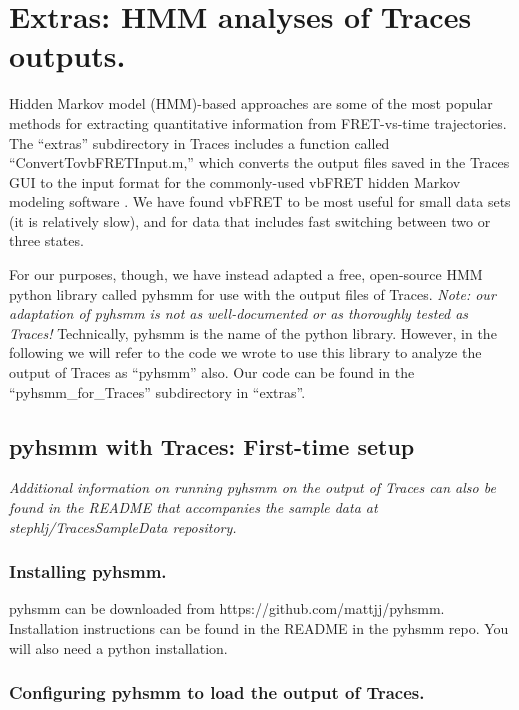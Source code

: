 \documentclass[11pt]{article}
\begin{document}
\newpage

\section{Extras: HMM analyses of Traces outputs.}\label{sec:extras}

Hidden Markov model (HMM)-based approaches are some of the most popular methods for extracting quantitative information from FRET-vs-time trajectories. The ``extras'' subdirectory in Traces includes a function called ``ConvertTovbFRETInput.m,'' which converts the output files saved in the Traces GUI to the input format for the commonly-used vbFRET hidden Markov modeling software \cite{Bronson2009}. We have found vbFRET to be most useful for small data sets (it is relatively slow), and for data that includes fast switching between two or three states.

For our purposes, though, we have instead adapted a free, open-source HMM python library called pyhsmm for use with the output files of Traces. {\it Note: our adaptation of pyhsmm is not as well-documented or as thoroughly tested as Traces!} Technically, pyhsmm is the name of the python library. However, in the following we will refer to the code we wrote to use this library to analyze the output of Traces as ``pyhsmm'' also. Our code can be found in the ``pyhsmm\_for\_Traces'' subdirectory in ``extras''.

\subsection{pyhsmm with Traces: First-time setup}

{\it Additional information on running pyhsmm on the output of Traces can also be found in the README that accompanies the sample data at stephlj/TracesSampleData repository.}

\subsubsection{Installing pyhsmm.}

pyhsmm can be downloaded from https://github.com/mattjj/pyhsmm. Installation instructions can be found in the README in the pyhsmm repo. You will also need a python installation.

\subsubsection{Configuring pyhsmm to load the output of Traces.}
\end{document}
